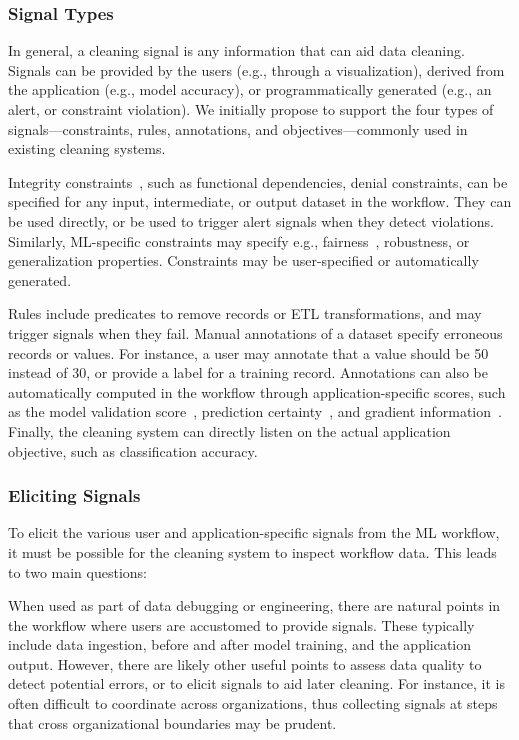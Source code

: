 \documentclass[11pt,dvipsnames]{article}
\begin{document}
\subsubsection{Signal Types}

In general, a cleaning signal is any information that can aid data cleaning.  Signals can be provided by the users (e.g., through a visualization), derived from the application (e.g., model accuracy), or programmatically generated (e.g., an alert, or constraint violation).
We initially propose to support the four types of signals---constraints, rules, annotations, and objectives---commonly used in existing cleaning systems.   

Integrity constraints~\cite{NADEEF}, such as functional dependencies, denial constraints, can be specified for any input, intermediate, or output dataset in the workflow.  They can be used directly, or be used to trigger alert signals when they detect violations.  
Similarly, ML-specific constraints may specify e.g., fairness~\cite{InterventionalFairness}, robustness, or generalization properties.
Constraints may be user-specified or automatically generated.

Rules include predicates to remove records or ETL transformations, and may trigger signals when they fail.  
Manual annotations of a dataset specify erroneous records or values.  For instance, a user may annotate that a value should be 50 instead of 30, or provide a label for a training record.   
Annotations can also be automatically computed in the workflow through application-specific scores, such as the model validation score~\cite{BoostClean, AutoSklearn, AlphaClean}, prediction certainty~\cite{CPClean}, and gradient information~\cite{ActiveClean}.
Finally, the cleaning system can directly listen on the actual application objective, such as classification accuracy.



\subsubsection{Eliciting Signals}
To elicit the various user and application-specific signals from the ML workflow, it must be possible for the cleaning system to inspect workflow data. This leads to two main questions:

  When used as part of data debugging or engineering, there are natural points in the workflow where users are accustomed to provide signals.  These typically include data ingestion, before and after model training, and the application output. However,  there are likely other useful points to assess data quality to detect potential errors, or to elicit signals to aid later cleaning.  For instance, it is often difficult to coordinate across organizations, thus collecting signals at steps that cross organizational boundaries may be prudent.
\end{document}
